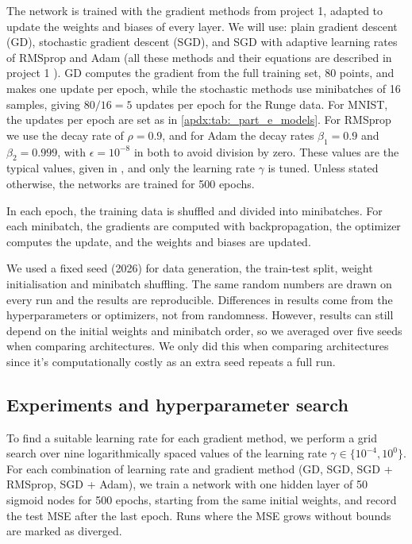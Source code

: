 \documentclass[reprint,english,notitlepage, floatfix]{revtex4-2}  %
\begin{document}
The network is trained with the gradient methods from project 1, adapted to update the weights and biases of every layer. We will use: plain gradient descent (GD), stochastic gradient descent (SGD), and SGD with adaptive learning rates of RMSprop and Adam (all these methods and their equations are described in project 1 \cite{p1}). GD computes the gradient from the full training set, 80 points, and makes one update per epoch, while the stochastic methods use minibatches of 16 samples, giving $80 / 16 = 5$ updates per epoch for the Runge data. For MNIST, the updates per epoch are set as in \cref{apdx:tab:_part_e_models}. For RMSprop we use the decay rate of $\rho = 0.9$, and for Adam the decay rates $\beta_1 = 0.9$ and $\beta_2 = 0.999$, with $\epsilon = 10^{-8}$ in both to avoid division by zero. These values are the typical values, given in \cite{lecture_book}, and only the learning rate $\gamma$ is tuned. Unless stated otherwise, the networks are trained for 500 epochs. 

In each epoch, the training data is shuffled and divided into minibatches. For each minibatch, the gradients are computed with backpropagation, the optimizer computes the update, and the weights and biases are updated.

We used a fixed seed (2026) for data generation, the train-test split, weight initialisation and minibatch shuffling. The same random numbers are drawn on every run and the results are reproducible. Differences in results come from the hyperparameters or optimizers, not from randomness. However, results can still depend on the initial weights and minibatch order, so we averaged over five seeds when comparing architectures. We only did this when comparing architectures since it's computationally costly as an extra seed repeats a full run.


\subsection{Experiments and hyperparameter search}

To find a suitable learning rate for each gradient method, we perform a grid search over nine logarithmically spaced values of the learning rate $\gamma \in \{10^{-4} , 10^{0}\}$. For each combination of learning rate and gradient method (GD, SGD, SGD + RMSprop, SGD + Adam), we train a network with one hidden layer of 50 sigmoid nodes for 500 epochs, starting from the same initial weights, and record the test MSE after the last epoch. Runs where the MSE grows without bounds are marked as diverged.
\end{document}
